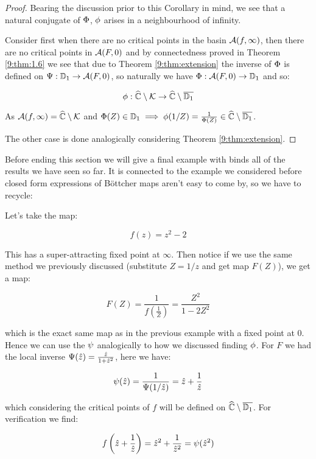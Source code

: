 \documentclass[../main.tex]{subfiles}
\begin{document}
\begin{proof}
Bearing the discussion prior to this Corollary in mind, we see that a natural conjugate of $\Phi$, $\phi$ arises in a neighbourhood of infinity. 

Consider first when there are no critical points in the basin $\mathcal{A}(f, \infty)$, then there are no critical points in $\mathcal{A}(F, 0)$ and by connectedness proved in Theorem \ref{9:thm:1.6} we see that due to Theorem \ref{9:thm:extension} the inverse of $\Phi$ is defined on $\Psi : \mathbb{D}_1 \to \mathcal{A}(F, 0)$, so naturally we have $\Phi : \mathcal{A}(F, 0) \to \mathbb{D}_1$ and so:

$$\phi: \widehat{\mathbb{C}} \setminus \mathcal{K} \to \widehat{\mathbb{C}} \setminus \overline{\mathbb{D}_1}$$

As $\mathcal{A}(f, \infty) = \widehat{\mathbb{C}} \setminus \mathcal{K}$ and $\Phi(Z) \in \mathbb{D}_1 \implies \phi(1/Z) = \frac{1}{\Phi(Z)} \in \widehat{\mathbb{C}} \setminus \overline{\mathbb{D}_1}$. 

The other case is done analogically considering Theorem \ref{9:thm:extension}. 

\end{proof}

Before ending this section we will give a final example with binds all of the results we have seen so far. It is connected to the example we considered before closed form expressions of B\"ottcher maps aren't easy to come by, so we have to recycle:

\begin{exl}
Let's take the map:

$$f(z) = z^2 -2$$ 

This has a super-attracting fixed point at $\infty$. Then notice if we use the same method we previously discussed (substitute $Z = 1/z$ and get map $F(Z)$), we get a map:

$$F(Z) = \frac{1}{f\left(\frac{1}{Z}\right)} = \frac{Z^2}{1-2Z^2}$$

which is the exact same map as in the previous example with a fixed point at 0. Hence we can use the $\psi$ analogically to how we discussed finding $\phi$. For $F$ we had the local inverse $\Psi(\hat{z}) = \frac{\hat{z}}{1+\hat{z}^2}$, here we have:

$$\psi(\hat{z}) = \frac{1}{\Psi(1/\hat{z})} = \hat{z} +\frac{1}{\hat{z}}$$

which considering the critical points of $f$ will be defined on $\widehat{\mathbb{C}} \setminus \overline{\mathbb{D}_1}$. For verification we find:

$$f\left(\hat{z} + \frac{1}{\hat{z}}\right) = \hat{z}^2 + \frac{1}{\hat{z}^2} = \psi(\hat{z}^2)$$


\end{exl}
    
\end{document}
